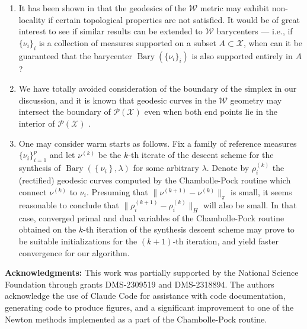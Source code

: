 \documentclass{article}
\DeclareMathOperator*{\Bary}{Bary}
\newcommand{\W}{\mathcal{W}}
\newcommand{\X}{\mathcal{X}}
\begin{document}
\begin{enumerate}
  \item It has been shown in \cite{erbarGeometryGeodesicsDiscrete2019} that the geodesics of the \(\W\) metric may exhibit non-locality if certain topological properties are not satisfied. It would be of great interest to see if similar results can be extended to \(\W\) barycenters --- i.e., if \(\{\nu_i\}_i\) is a collection of measures supported on a subset \(A \subset \X\), when can it be guaranteed that the barycenter \(\Bary(\{\nu_i\}_i)\) is also supported entirely in \(A\)?
  \item We have totally avoided consideration of the boundary of the simplex in our discussion, and it is known that geodesic curves in the \(\W\) geometry may intersect the boundary of \(\mathcal{P}(\X)\) even when both end points lie in the interior of \(\mathcal{P}(\X)\) \cite{gangboGeodesicsMinimalLength2019}. 
  \item One may consider warm starts as follows.  Fix a family of reference measures \(\{\nu_i\}_{i=1}^p\) and let \(\nu^{(k)}\) be the \(k\)-th iterate of the descent scheme for the synthesis of \(\Bary(\left\{\nu_i\right\}, \lambda)\) for some arbitrary \(\lambda\). Denote by \(\rho_i^{(k)}\) the (rectified) geodesic curves computed by the Chambolle-Pock routine which connect \(\nu^{(k)}\) to \(\nu_i\). Presuming that \(\|\nu^{(k+1)} - \nu^{(k)}\|_{\pi}\) is small, it seems reasonable to conclude that \(\|\rho_i^{(k+1)} - \rho_i^{(k)}\|_H\) will also be small. In that case, converged primal and dual variables of the Chambolle-Pock routine obtained on the \(k\)-th iteration of the synthesis descent scheme may prove to be suitable initializations for the \((k+1)\)-th iteration, and yield faster convergence for our algorithm.
\end{enumerate}

\vspace{10pt}

\noindent \textbf{Acknowledgments:}  This work was partially supported by the National Science Foundation through grants DMS-2309519 and DMS-2318894. The authors acknowledge the use of Claude Code for assistance with code documentation, generating code to produce figures, and a significant improvement to one of the Newton methods implemented as a part of the Chambolle-Pock routine.





\end{document}

